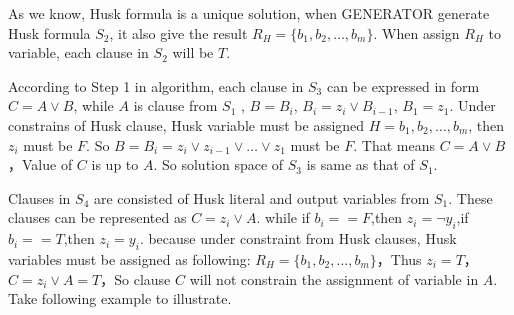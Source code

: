 \documentclass[runningheads,a4paper]{llncs}
\begin{document}
As we know, Husk formula is a unique solution, when GENERATOR generate Husk formula $S_2$,
it also give the result $R_H=\{b_1,b_2,\dots,b_m\}$.
When assign $R_H$ to variable, each clause in $S_2$ will be $T$.

According to Step 1 in algorithm, each clause in $S_3$ can be expressed in form $C=A\vee B$,
while $A$ is clause from $S_1$ , $B=B_i$, $B_i=z_i\vee B_{i-1}$, $B_1= z_1$.
Under constrains of Husk clause, Husk variable must be assigned $H={b_1,b_2,\dots,b_m}$, then $z_i$ must be $F$. So $B=B_i=z_i\vee z_{i-1}\vee\dots\vee z_1$ must be $F$. 
That means $C=A\vee B$，Value of $C$ is up to $A$. So solution space of $S_3$ is same as that of $S_1$.


% 
% 
% 
% 
% 
% 
% 
% 
% 
% 
% 
%
% 
Clauses in $S_4$ are consisted of Husk literal and output variables from $S_1$.
These clauses can be represented as $C= z_i\vee A$. while if $b_i==F$,then $z_i= \neg y_i$,if $b_i ==T$,then $z_i =y_i$.
because under constraint from Husk clauses, Husk variables  must be assigned as following: 
$R_H=\{b_1,b_2,\dots,b_m\}$，Thus $z_i=T$，$C=z_i\vee A=T$，So clause $C$ will not constrain the assignment of variable in $A$.
Take following example to illustrate.
\end{document}
